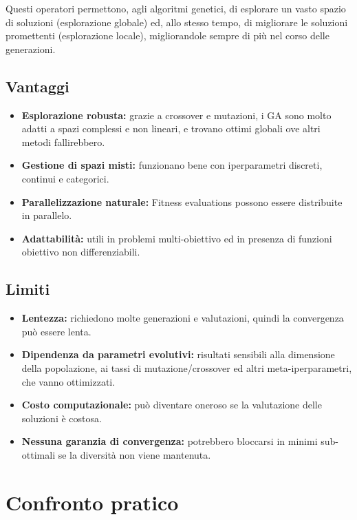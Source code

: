 \documentclass[a4paper,12pt]{report}
\begin{document}
	Questi operatori permettono, agli algoritmi genetici, di esplorare un vasto spazio di soluzioni (esplorazione globale) ed, allo stesso tempo, di migliorare le soluzioni promettenti (esplorazione locale), migliorandole sempre di più nel corso delle generazioni.
	
	\subsection{Vantaggi}
	\begin{itemize}
		\item \textbf{Esplorazione robusta:} grazie a crossover e mutazioni, i GA sono molto adatti a spazi complessi e non lineari, e trovano ottimi globali ove altri metodi fallirebbero.
		\item \textbf{Gestione di spazi misti:} funzionano bene con iperparametri discreti, continui e categorici.
		\item \textbf{Parallelizzazione naturale:} Fitness evaluations possono essere distribuite in parallelo.
		\item \textbf{Adattabilità:} utili in problemi multi-obiettivo ed in presenza di funzioni obiettivo non differenziabili.
	\end{itemize}
	
	\subsection{Limiti}
	\begin{itemize}
		\item \textbf{Lentezza:} richiedono molte generazioni e valutazioni, quindi la convergenza può essere lenta.
		\item \textbf{Dipendenza da parametri evolutivi:} risultati sensibili alla dimensione della popolazione, ai tassi di mutazione/crossover ed altri meta-iperparametri, che vanno ottimizzati.
		\item \textbf{Costo computazionale:} può diventare oneroso se la valutazione delle soluzioni è costosa.
		\item \textbf{Nessuna garanzia di convergenza:} potrebbero bloccarsi in minimi sub-ottimali se la diversità non viene mantenuta.
	\end{itemize}
	
	\section{Confronto pratico}
	
\end{document}
